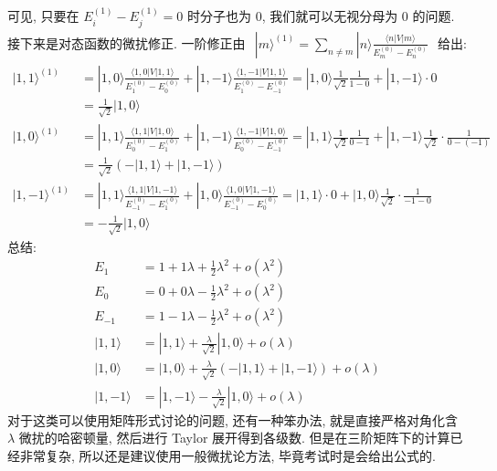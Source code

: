 \documentclass[../../main.tex]{subfiles}
\begin{document}
\begin{enumerate}
\begin{enumerate}
{{\begin{align*}
    \end{align*}
    可见, 只要在 $E_{i}^{(1)} - E_{j}^{(1)}=0$ 时分子也为 $0$, 我们就可以无视分母为 $0$ 的问题. 
    接下来是对态函数的微扰修正. 一阶修正由 $\begin{aligned}
      |m\rangle^{(1)} = \sum_{n\neq m}|n\rangle\frac{\langle n|V|m\rangle}{E_{m}^{(0)} - E_{n}^{(0)}}
    \end{aligned}$ 给出:
    \begin{align*}
      |1,1\rangle^{(1)} &= |1,0\rangle\frac{\langle 1,0|V|1,1\rangle}{E_{1}^{(0)} - E_{0}^{(0)}} + |1,-1\rangle\frac{\langle 1,-1|V|1,1\rangle}{E_{1}^{(0)} - E_{-1}^{(0)}} = |1,0\rangle\frac{1}{\sqrt{2}}\frac{1}{1 - 0} + |1,-1\rangle\cdot 0 \\
      &= \boxed{\frac{1}{\sqrt{2}}|1,0\rangle}\\
      |1,0\rangle^{(1)} &= |1,1\rangle\frac{\langle 1,1|V|1,0\rangle}{E_{0}^{(0)} - E_{1}^{(0)}} + |1,-1\rangle\frac{\langle 1,-1|V|1,0\rangle}{E_{0}^{(0)} - E_{-1}^{(0)}} = |1,1\rangle \frac{1}{\sqrt{2}}\frac{1}{0-1} + |1,-1\rangle \frac{1}{\sqrt{2}}\cdot\frac{1}{0-(-1)} \\
      &= \boxed{\frac{1}{\sqrt{2}}(-|1,1\rangle + |1,-1\rangle)}\\
      |1,-1\rangle^{(1)} &= |1,1\rangle\frac{\langle 1,1|V|1,-1\rangle}{E_{-1}^{(0)}-E_{1}^{(0)}} + |1,0\rangle\frac{\langle 1,0|V|1,-1\rangle}{E_{-1}^{(0)}-E_{0}^{(0)}} = |1,1\rangle\cdot 0 + |1,0\rangle\frac{1}{\sqrt{2}}\cdot\frac{1}{-1-0} \\
      &= \boxed{-\frac{1}{\sqrt{2}}|1,0\rangle}
    \end{align*}
    总结:
    \begin{align*}
      E_{1} & = 1 + 1\lambda + \frac{1}{2}\lambda^{2} + \mathit{o}(\lambda^{2})\\
      E_{0} & = 0 + 0\lambda - \frac{1}{2}\lambda^{2} +  \mathit{o}(\lambda^{2})\\
      E_{-1} &= 1 - 1\lambda - \frac{1}{2}\lambda^{2} + \mathit{o}(\lambda^{2})\\
      |1,1\rangle &= |1,1\rangle + \frac{\lambda}{\sqrt{2}}|1,0\rangle + \mathit{o}(\lambda)\\
      |1,0\rangle &= |1,0\rangle + \frac{\lambda}{\sqrt{2}}(-|1,1\rangle + |1,-1\rangle) + \mathit{o}(\lambda)\\
      |1,-1\rangle &= |1,-1\rangle - \frac{\lambda}{\sqrt{2}}|1,0\rangle + \mathit{o}(\lambda)
    \end{align*}
    对于这类可以使用矩阵形式讨论的问题, 还有一种笨办法, 就是直接严格对角化含 $\lambda$ 微扰的哈密顿量, 然后进行 Taylor 展开得到各级数. 但是在三阶矩阵下的计算已经非常复杂, 所以还是建议使用一般微扰论方法, 毕竟考试时是会给出公式的.}}
  \end{enumerate}


\end{enumerate}
\end{document}
